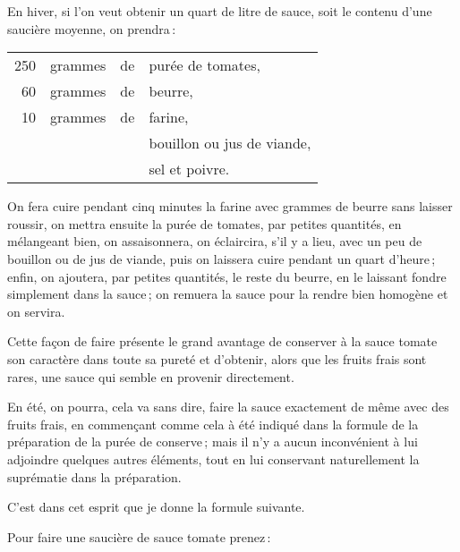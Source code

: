 \medskip

En hiver, si l’on veut obtenir un quart de litre de sauce, soit le contenu d'une
saucière moyenne, on prendra :

\medskip

\footnotesize
\begin{longtable}{rrrp{16em}}
    250 & grammes & de & purée de tomates,                                                                \\
     60 & grammes & de & beurre,                                                                          \\
     10 & grammes & de & farine,                                                                          \\
        &         &    & bouillon ou jus de viande,                                                       \\
        &         &    & sel et poivre.                                                                   \\
\end{longtable}
\normalsize

On fera cuire pendant cinq minutes la farine avec {\mmm} grammes de beurre sans
laisser roussir, on mettra ensuite la purée de tomates, par petites quantités,
en mélangeant bien, on assaisonnera, on éclaircira, s'il y a lieu, avec un peu
de bouillon ou de jus de viande, puis on laissera cuire pendant un quart
d'heure ; enfin, on ajoutera, par petites quantités, le reste du beurre, en le
laissant fondre simplement dans la sauce ; on remuera la sauce pour la rendre
bien homogène et on servira.

Cette façon de faire présente le grand avantage de conserver à la sauce tomate
son caractère dans toute sa pureté et d’obtenir, alors que les fruits frais
sont rares, une sauce qui semble en provenir directement.

\sk

En été, on pourra, cela va sans dire, faire la sauce exactement de même avec
des fruits frais, en commençant comme cela à été indiqué dans la formule de la
préparation de la purée de conserve ; mais il n'y a aucun inconvénient à lui
adjoindre quelques autres éléments, tout en lui conservant naturellement la
suprématie dans la préparation.

C'est dans cet esprit que je donne la formule suivante.

\medskip

Pour faire une saucière de sauce tomate prenez :

